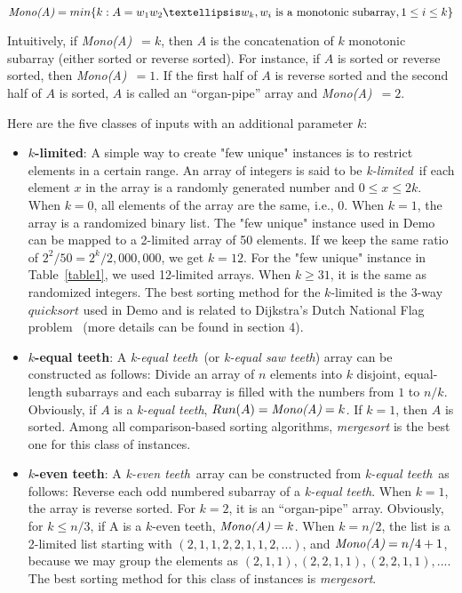 \documentclass[AMA,STIX1COL]{WileyNJD-v2}
\newcommand{\klit}{\emph{k-limited}}
\newcommand{\keq}{\emph{k-equal teeth}}
\newcommand{\kev}{\emph{k-even teeth}}
\newcommand {\mono}{\emph{Mono(A)}}
\newcommand{\msort}{\emph{mergesort }}
\newcommand{\msortn}{\emph{mergesort}}
\begin{document}
\[ \mono = min\{ k : A =  w_1 w_2 … w_k, w_i  \text { is a monotonic subarray},1 \leq i \le k\} \]
           
Intuitively, if \mono\ $= k$, then $A$ is the concatenation of $k$ monotonic subarray (either sorted or reverse sorted). 
For instance, if $A$ is sorted or reverse sorted, then \mono\ $ = 1$. 
If the first half of $A$ is reverse sorted and the second half of $A$ is sorted, $A$ is called an “organ-pipe” array and \mono\ $ = 2$.  

Here are the five classes of inputs with an additional parameter $k$:

\begin{itemize}
\item \textbf{$k$-limited}: A simple way to create "few unique" instances is to restrict elements in a certain range. 
An array of integers is said to be \klit \ if each element $x$ in the array is a randomly generated number and $0 \leq x \leq 2k$. 
When $k = 0$, all elements of the array are the same, i.e., 0. 
When $k = 1$, the array is a randomized binary list. 
The "few unique" instance used in Demo can be mapped to a 2-limited array of 50 elements.  
If we keep the same ratio of $2^2/50 = 2^k/2,000,000$, we get $k = 12$.  
For the "few unique" instance in Table~\ref{table1}, we used 12-limited arrays.  
When $k \ge 31$, it is the same as randomized integers. 
The best sorting method for the $k$-limited is the $3$-way $quicksort$ used in Demo and is related to Dijkstra’s Dutch National Flag problem~\cite{kim2009improving} (more details can be found in section 4).

\item \textbf{$k$-equal teeth}: 
A \keq \ (or \emph{k-equal saw teeth}) array can be constructed as follows: Divide an array of $n$ elements into $k$ disjoint, equal-length subarrays and each subarray is filled with the numbers from $1$ to $n/k$. Obviously, if $A$ is a \keq, $Run(A) = \mono = k$. If $k = 1$, then $A$ is sorted. 
Among all comparison-based sorting algorithms, \msort is the best one for this class of instances.

\item \textbf{$k$-even teeth}:  A \kev \ array can be constructed from \keq \ as follows: 
Reverse each odd numbered subarray of a \keq. 
When $k = 1$, the array is reverse sorted. 
For $k = 2$, it is an ``organ-pipe” array.  
Obviously, for $k \leq n/3$, if A is a $k$-even teeth, $\mono = k$. 
When $k = n/2$, the list is a 2-limited list starting with $(2,1,1,2,2,1,1,2, ...)$, and $\mono =  n/4+1$, because we may group the elements as $(2,1,1), (2,2,1,1), (2,2,1,1), ...$. 
The best sorting method for this class of instances is \msortn.


\end{itemize}
\end{document}
